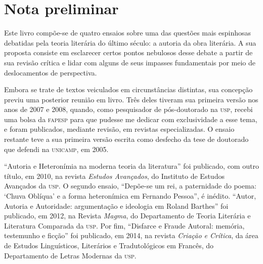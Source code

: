 \chapter*{Nota preliminar}

Este livro compõe-se de quatro ensaios sobre uma das questões mais espinhosas debatidas pela teoria literária do último século: a autoria da obra literária. A sua proposta consiste em esclarecer certos pontos nebulosos desse debate a partir de sua revisão crítica e lidar com alguns de seus impasses fundamentais por meio de deslocamentos de perspectiva.

Embora se trate de textos veiculados em circunstâncias distintas, sua concepção previu uma posterior reunião em livro. Três deles tiveram sua primeira versão nos anos de 2007 e 2008, quando, como pesquisador de pós-doutorado na \textsc{usp}, recebi uma bolsa da \textsc{fapesp} para que pudesse me dedicar com exclusividade a esse tema, e foram publicados, mediante revisão, em revistas especializadas. O ensaio restante teve a sua primeira versão escrita como desfecho da tese de doutorado que defendi na \textsc{unicamp}, em 2005.

``Autoria e Heteronímia na moderna teoria da literatura'' foi publicado, com outro título, em 2010, na revista \emph{Estudos Avançados}, do Instituto de Estudos Avançados da \textsc{usp}. O segundo ensaio, ``Depõe-se um rei, a paternidade do poema: `Chuva Oblíqua' e a forma heteronímica em Fernando Pessoa'', é inédito. ``Autor, Autoria e Autoridade: argumentação e ideologia em Roland Barthes'' foi publicado, em 2012, na Revista \emph{Magma}, do Departamento de Teoria Literária e Literatura Comparada da \textsc{usp}. Por fim, ``Disfarce e Fraude Autoral: memória, testemunho e ficção'' foi publicado, em 2014, na revista \emph{Criação e Crítica}, da área de Estudos Linguísticos, Literários e Tradutológicos em Francês, do Departamento de Letras Modernas da \textsc{usp}. 

